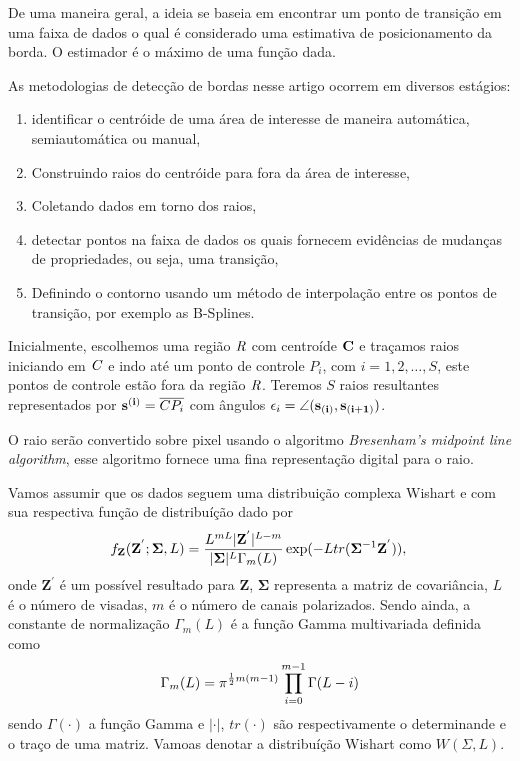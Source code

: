 \documentclass[12pt,a4paper]{article}
\begin{document}
De uma maneira geral, a ideia se baseia em encontrar um ponto de transição em uma faixa de dados o qual é considerado uma estimativa de posicionamento da borda. O estimador é o máximo de uma função dada. 

As metodologias de detecção de bordas nesse artigo ocorrem em diversos estágios:

\begin{enumerate}
	\item identificar o centróide de uma área de interesse de maneira automática, semiautomática ou manual,  
	\item Construindo raios do centróide para fora da área de interesse,
	\item Coletando dados em torno dos raios,
	\item detectar pontos na faixa de dados os quais fornecem evidências de mudanças de propriedades, ou seja, uma transição,
	\item Definindo o contorno usando um método de interpolação entre os pontos de transição, por exemplo as B-Splines.
\end{enumerate}

Inicialmente, escolhemos uma região $\it R$ com centroíde $\bf C$ e traçamos raios iniciando em $\it C$ e indo até um ponto de controle $P_i$, com $i=1,2,\dots, S$, este pontos de controle estão fora da região $\it R$. Teremos $S$ raios resultantes representados por ${\bf s^{(i)}}=\overline{CP_i}$ com ângulos $\epsilon_{i}=\angle ({\bf s_{(i)}},{\bf s_{(i+1)}})$. 

O raio serão convertido sobre pixel usando o algoritmo {\it Bresenham's midpoint line algorithm}, esse algoritmo fornece uma fina representação digital para o raio.

Vamos assumir que os dados seguem uma distribuição complexa Wishart e com sua respectiva função de distribuíção dado por 
\begin{equation}\label{eqn120}
	f_{\mathbf{Z}}(\mathbf{Z^{'}};\mathbf{\Sigma},L)=\frac{L^{mL}|\mathbf{Z^{'}}|^{L-m}}{|\mathbf{\Sigma}|^{L}\Gamma_m(L)} \exp(-L tr(\mathbf{\Sigma}^{-1}\mathbf{Z^{'}})), \\
\end{equation}
onde $\mathbf{Z^{'}}$ é um possível resultado para $\mathbf{Z}$, $\mathbf{\Sigma}$ representa a matriz de covariância, $L$ é o número de visadas, $m$ é o número de canais polarizados.
Sendo ainda, a constante de normalização $\Gamma_m(L)$ é a função Gamma multivariada definida como 
\begin{equation}\label{eqn121}
	\Gamma_m(L)=\pi^{\frac{1}{2}m(m-1)} \prod_{i=0}^{m-1}\Gamma(L-i) \\
\end{equation}
sendo $\Gamma(\cdot)$ a função Gamma e $|\cdot|$, $tr(\cdot)$ são respectivamente o determinande e o traço de uma matriz. Vamoas denotar a distribuíção Wishart como $W(\Sigma,L)$. 
\end{document}
